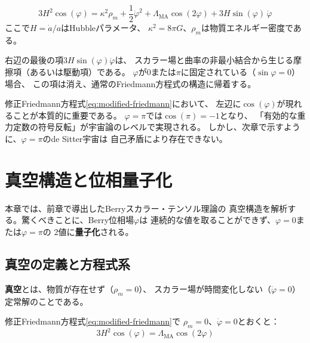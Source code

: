 \begin{keyresult}[修正Friedmann方程式]
\begin{equation}
\boxed{
3H^2\cos(\varphi)
= \kappa^2\rho_m
+ \frac{1}{2}\dot\varphi^2
+ \Lambda_{\mathrm{MA}}\cos(2\varphi)
+ 3H\sin(\varphi)\,\dot\varphi
}
\label{eq:modified-friedmann}
\end{equation}
ここで$H = \dot a / a$はHubbleパラメータ、
$\kappa^2 = 8\pi G$、$\rho_m$は物質エネルギー密度である。
\end{keyresult}

\noindent
右辺の最後の項$3H\sin(\varphi)\dot\varphi$は、
スカラー場と曲率の非最小結合から生じる摩擦項（あるいは駆動項）である。
$\varphi$が$0$または$\pi$に固定されている（$\sin\varphi = 0$）場合、
この項は消え、通常のFriedmann方程式の構造に帰着する。

\begin{remark}
修正Friedmann方程式\eqref{eq:modified-friedmann}において、
左辺に$\cos(\varphi)$が現れることが本質的に重要である。
$\varphi = \pi$では$\cos(\pi) = -1$となり、
「有効的な重力定数の符号反転」が宇宙論のレベルで実現される。
しかし、次章で示すように、$\varphi=\pi$のde Sitter宇宙は
自己矛盾により存在できない。
\end{remark}



\chapter{真空構造と位相量子化}
\label{ch:vacuum-quantization}

本章では、前章で導出したBerryスカラー・テンソル理論の
真空構造を解析する。驚くべきことに、Berry位相場$\varphi$は
連続的な値を取ることができず、$\varphi = 0$または$\varphi = \pi$の
2値に\textbf{量子化}される。

\section{真空の定義と方程式系}
\label{sec:9.1}

\textbf{真空}とは、物質が存在せず（$\rho_m = 0$）、
スカラー場が時間変化しない（$\dot\varphi = 0$）
定常解のことである。

修正Friedmann方程式\eqref{eq:modified-friedmann}で
$\rho_m = 0$、$\dot\varphi = 0$とおくと：
\begin{equation}
3H^2\cos(\varphi) = \Lambda_{\mathrm{MA}}\cos(2\varphi)
\label{eq:vacuum-friedmann}
\end{equation}

